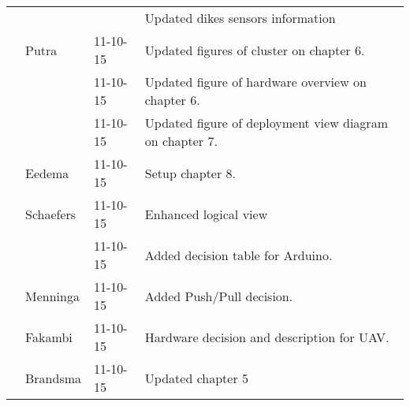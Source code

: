 \begin{longtable}{L{} L{} L{} L{}}
        &           &          & Updated dikes sensors information \\
        & Putra     & 11-10-15 & Updated figures of cluster on chapter 6.\\
        &           & 11-10-15 & Updated figure of hardware overview on chapter 6.\\
        &           & 11-10-15 & Updated figure of deployment view diagram on chapter 7.\\
        & Eedema    & 11-10-15 & Setup chapter 8.\\
        & Schaefers & 11-10-15 & Enhanced logical view \\
        &           & 11-10-15 & Added decision table for Arduino.\\
        & Menninga  & 11-10-15 & Added Push/Pull decision. \\
        & Fakambi   & 11-10-15 & Hardware decision and description for UAV. \\
        & Brandsma  & 11-10-15 & Updated chapter 5 \\
    
    \bottomrule
\end{longtable}